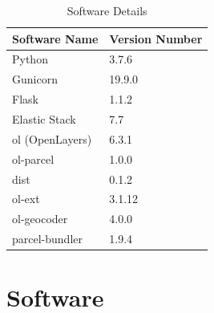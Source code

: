 \documentclass[]{report}
\begin{document}
\begin{table}[ht]
\label{software}
\begin{center}
\begin{tabular} {l|l} %
\hline
\hline
\textbf{Software Name} & \textbf{Version Number} \\
\hline
Python & 3.7.6 \\
Gunicorn & 19.9.0 \\
Flask & 1.1.2 \\
Elastic Stack & 7.7 \\
ol (OpenLayers) & 6.3.1 \\
ol-parcel & 1.0.0\\
dist & 0.1.2 \\
ol-ext & 3.1.12 \\
ol-geocoder & 4.0.0 \\
parcel-bundler & 1.9.4\\
\hline 
\hline
\end{tabular}
\end{center}
\caption{Software Details}
\end{table}


\section{Software}
\end{document}
